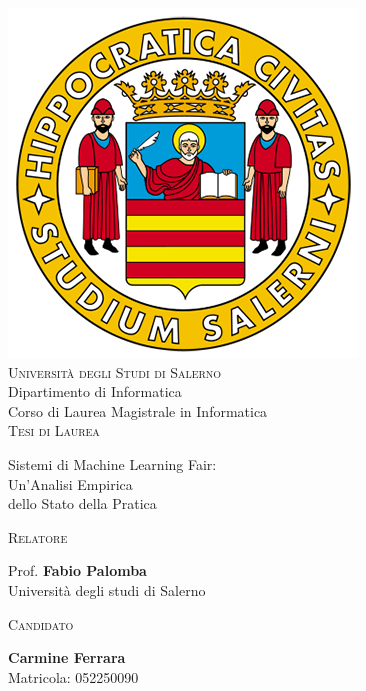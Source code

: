 \begin{titlepage}
\changepage{}{}{}{-7.5 mm}{}{}{}{}{}


\begin{center}
\includegraphics [width=.15\columnwidth, angle=0]{figure/logo_standard.png}\\ %
\vspace{0.5cm}
{\LARGE \scshape Università degli Studi di Salerno}\\
\vspace{0.5cm}
{\Large Dipartimento di Informatica}\\
\vspace{0.1cm}
{\large Corso di Laurea Magistrale in Informatica}\\
\vspace{1.5cm}
{\Large \scshape Tesi di Laurea} \\
\vspace{3cm}
{\Huge \bfseries \begin{nointerlinea}{1}Sistemi di Machine Learning Fair:\\Un'Analisi Empirica\\dello Stato della Pratica\\\end{nointerlinea}} 
\vspace{5cm}

\begin{minipage}[t]{7cm}
\flushleft
\textsc{Relatore}

Prof. \textbf{Fabio Palomba} \\
{\small Università degli studi di Salerno} \\[0.25cm]
\end{minipage}
\hfill
\begin{minipage}[t]{7cm}
\flushright
\textsc{Candidato}

\textbf{Carmine Ferrara} \\
Matricola: 052250090
\end{minipage}


\end{center}
\end{titlepage}

